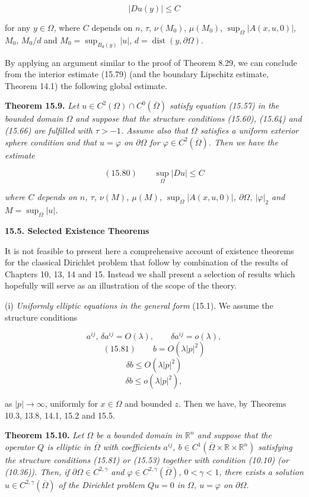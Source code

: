 \begin{equation}
\tag{15.79}
|Du(y)|\leq C
\end{equation}


for any $y \in \Omega$, where $C$ depends on $n$, $\tau$, $\nu(M_0)$, $\mu(M_0)$, $\sup_{\Omega} |A(x,u,0)|$, $M_0$, $M_0/d$ and $M_0 = \sup_{B_d(y)} |u|$, $d = \operatorname{dist}(y,\partial\Omega)$.

By applying an argument similar to the proof of Theorem 8.29, we can conclude from the interior estimate (15.79) (and the boundary Lipschitz estimate, Theorem 14.1) the following global estimate.

\textbf{Theorem 15.9.} \emph{Let $u \in C^2(\Omega) \cap C^0(\overline{\Omega})$ satisfy equation (15.57) in the bounded domain $\Omega$ and suppose that the structure conditions (15.60), (15.64) and (15.66) are fulfilled with $\tau > -1$. Assume also that $\Omega$ satisfies a uniform exterior sphere condition and that $u = \varphi$ on $\partial\Omega$ for $\varphi \in C^2(\overline{\Omega})$. Then we have the estimate}

\[
(15.80)\qquad \sup_{\Omega} |Du| \leq C
\]

\emph{where $C$ depends on $n$, $\tau$, $\nu(M)$, $\mu(M)$, $\sup_{\Omega} |A(x,u,0)|$, $\partial\Omega$, $|\varphi|_2$ and $M = \sup_{\Omega} |u|$.}

\medskip

\noindent\textbf{15.5. Selected Existence Theorems}

It is not feasible to present here a comprehensive account of existence theorems for the classical Dirichlet problem that follow by combination of the results of Chapters 10, 13, 14 and 15. Instead we shall present a selection of results which hopefully will serve as an illustration of the scope of the theory.

\noindent (i) \emph{Uniformly elliptic equations in the general form} (15.1). We assume the structure conditions

\[
a^{ij},\,\delta a^{ij} = O(\lambda),
\qquad
\delta a^{ij} = o(\lambda),
\]
\[
(15.81)\qquad b = O(\lambda |p|^2)
\]
\[
\delta b \leq O(\lambda |p|^2)
\]
\[
\delta b \leq o(\lambda |p|^2),
\]

as $|p| \to \infty$, uniformly for $x \in \Omega$ and bounded $z$. Then we have, by Theorems 10.3, 13.8, 14.1, 15.2 and 15.5.

\textbf{Theorem 15.10.} \emph{Let $\Omega$ be a bounded domain in $\mathbb{R}^n$ and suppose that the operator $Q$ is elliptic in $\overline{\Omega}$ with coefficients $a^{ij}$, $b \in C^1(\overline{\Omega} \times \mathbb{R} \times \mathbb{R}^n)$ satisfying the structure conditions (15.81) or (15.53) together with condition (10.10) (or (10.36)). Then, if $\partial\Omega \in C^{2,\gamma}$ and $\varphi \in C^{2,\gamma}(\overline{\Omega})$, $0 < \gamma < 1$, there exists a solution $u \in C^{2,\gamma}(\overline{\Omega})$ of the Dirichlet problem $Qu = 0$ in $\Omega$, $u = \varphi$ on $\partial\Omega$.}

